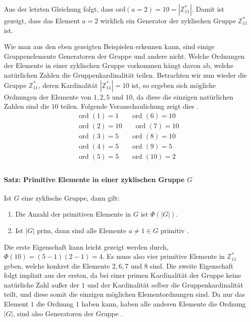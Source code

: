 Aus der letzten Gleichung folgt, dass ord$(a=2)=10=|\mathbb{Z}^*_{11}|$. Damit ist gezeigt, dass das Element $a = 2$ wirklich ein Generator der zyklischen Gruppe $\mathbb{Z}^*_{11}$ ist.

Wie man aus den eben gezeigten Beispielen erkennen kann, sind einige Gruppenelemente Generatoren der Gruppe und andere nicht. Welche Ordnungen der Elemente in einer zyklischen Gruppe vorkommen hängt davon ab, welche natürlichen Zahlen die Gruppenkardinalität teilen. Betrachten wir nun wieder die Gruppe $\mathbb{Z}^*_{11}$, deren Kardinalität $|\mathbb{Z}^*_{11}| = 10$ ist, so ergeben sich mögliche Ordnungen der Elemente von $1,2,5 \text{ und }10$, da diese die einzigen natürlichen Zahlen sind die $10$ teilen. Folgende Veranschaulichung zeigt dies \cite[S. 243, 244]{Paar.2016}.
\begin{align*}
&\text{ord }(1) = 1 \qquad \text{ord }(6) = 10\\
&\text{ord }(2) = 10 \qquad \text{ord }(7) = 10\\
&\text{ord }(3) = 5 \qquad \text{ord }(8) = 10\\
&\text{ord }(4) = 5 \qquad \text{ord }(9) = 5\\
&\text{ord }(5) = 5 \qquad \text{ord }(10) = 2\\
\end{align*}

\paragraph{Satz: Primitive Elemente in einer zyklischen Gruppe $G$}
Ist $G$ eine zyklische Gruppe, dann gilt:
\begin{enumerate}
\item Die Anzahl der primitiven Elemente in $G$ ist $\Phi (|G|)$.
\item Ist $|G|$ prim, dann sind alle Elemente $a \neq 1 \in G$ primitiv \cite[S. 244]{Paar.2016}.
\end{enumerate}

Die erste Eigenschaft kann leicht gezeigt werden durch, $\Phi(10) = (5-1)(2-1) = 4$. Es muss also vier primitive Elemente in $\mathbb{Z}^*_{11}$ geben, welche konkret die Elemente $2,6,7$ und $8$ sind. Die zweite Eigenschaft folgt implizit aus der ersten, da bei einer primen Kardinalität der Gruppe keine natürliche Zahl außer der $1$ und der Kardinalität selber die Gruppenkardinalität teilt, und diese somit die einzigen möglichen Elementordnungen sind. Da nur das Element $1$ die Ordnung $1$ haben kann, haben alle anderen Elemente die Ordnung $|G|$, sind also Generatoren der Gruppe \cite[S. 244]{Paar.2016}.

